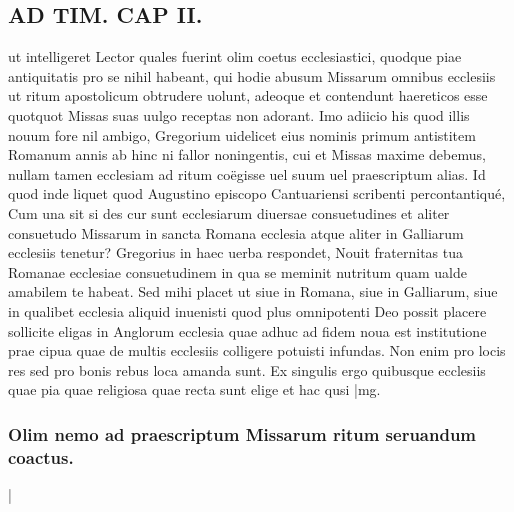 \documentclass{article}
\begin{document}
\begin{pages}
\section*{AD TIM. CAP II. }
\marginpar{[ p.110 ]}\pstart ut intelligeret Lector quales fuerint olim coetus ecclesiastici, quodque piae antiquitatis pro se nihil habeant, qui hodie abusum Missarum omnibus ecclesiis ut ritum apostolicum obtrudere uolunt, adeoque et contendunt haereticos esse quotquot Missas suas uulgo receptas non adorant. Imo adiicio his quod illis nouum fore nil ambigo, Gregorium uidelicet eius nominis primum antistitem Romanum annis ab hinc ni fallor noningentis, cui et Missas maxime debemus, nullam tamen ecclesiam ad ritum coëgisse uel suum uel praescriptum alias. Id quod inde liquet quod Augustino episcopo Cantuariensi scribenti percontantiqué, Cum una sit si des cur sunt ecclesiarum diuersae consuetudines et aliter consuetudo Missarum in sancta Romana ecclesia atque aliter in Galliarum ecclesiis tenetur? Gregorius in haec uerba respondet, Nouit fraternitas tua Romanae ecclesiae consuetudinem in qua se meminit nutritum quam ualde amabilem te habeat. Sed mihi placet ut siue in Romana, siue in Galliarum, siue in qualibet ecclesia aliquid inuenisti quod plus omnipotenti Deo possit placere sollicite eligas in Anglorum ecclesia quae adhuc ad fidem noua est institutione prae cipua quae de multis ecclesiis colligere potuisti infundas. Non enim pro locis res sed pro bonis rebus loca amanda sunt. Ex singulis ergo quibusque ecclesiis quae pia quae religiosa quae recta sunt elige et hac qusi  \pend
|mg. \subsubsection*{Olim nemo ad praescriptum Missarum ritum seruandum coactus. }|

\end{pages}
\end{document}
